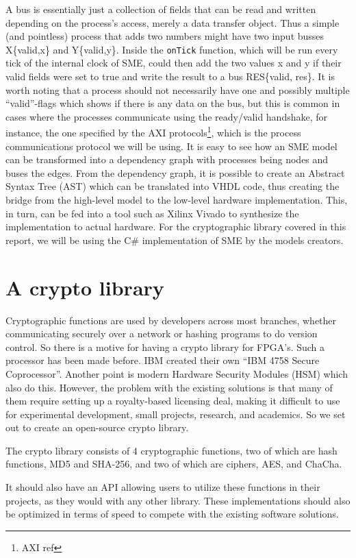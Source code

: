 \documentclass[a4paper, openany]{book}
\begin{document}
A bus is essentially just a collection of fields that can be read and written depending on the process's access, merely a data transfer object. Thus a simple (and pointless) process that adds two numbers might have two input busses X\{valid,x\} and Y\{valid,y\}. Inside the \texttt{onTick} function, which will be run every tick of the internal clock of SME, could then add the two values x and y if their valid fields were set to true and write the result to a bus RES\{valid, res\}. It is worth noting that a process should not necessarily have one and possibly multiple ``valid''-flags which shows if there is any data on the bus, but this is common in cases where the processes communicate using the ready/valid handshake, for instance, the one specified by the AXI protocols\footnote{AXI ref}, which is the process communications protocol we will be using. It is easy to see how an SME model can be transformed into a dependency graph with processes being nodes and buses the edges. From the dependency graph, it is possible to create an Abstract Syntax Tree (AST) which can be translated into VHDL code\cite{sme}, thus creating the bridge from the high-level model to the low-level hardware implementation. This, in turn, can be fed into a tool such as Xilinx Vivado to synthesize the implementation to actual hardware. For the cryptographic library covered in this report, we will be using the C\# implementation of SME by the models creators\cite{sme}.
\section{A crypto library}
\label{sec:org934ef0c}
Cryptographic functions are used by developers across most branches, whether communicating securely over a network or hashing programs to do version control.
So there is a motive for having a crypto library for FPGA's. Such a processor has been made before. IBM created their own ``IBM 4758 Secure Coprocessor''\cite{IBM4758}. Another point is modern Hardware Security Modules (HSM) which also do this.
However, the problem with the existing solutions is that many of them require setting up a royalty-based licensing deal, making it difficult to use for experimental development, small projects, research, and academics.
So we set out to create an open-source crypto library.

The crypto library consists of 4 cryptographic functions, two of which are hash functions, MD5 and SHA-256, and two of which are ciphers, AES, and ChaCha.

It should also have an API allowing users to utilize these functions in their projects, as they would with any other library.
These implementations should also be optimized in terms of speed to compete with the existing software solutions.
\end{document}
